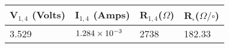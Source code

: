 \begin{tabular}{@{}llll@{}}
\toprule
\textbf{V$_{1,4}$ (Volts)} & \textbf{I$_{1,4}$ (Amps)} & \textbf{R$_{1,4} $($\Omega $)} & \textbf{R$_\square$($\Omega / \square $)} \\ \midrule
3.529                      & $1.284\times10^{-3}$             & 2738                           & 182.33                                    \\ \bottomrule
\end{tabular}